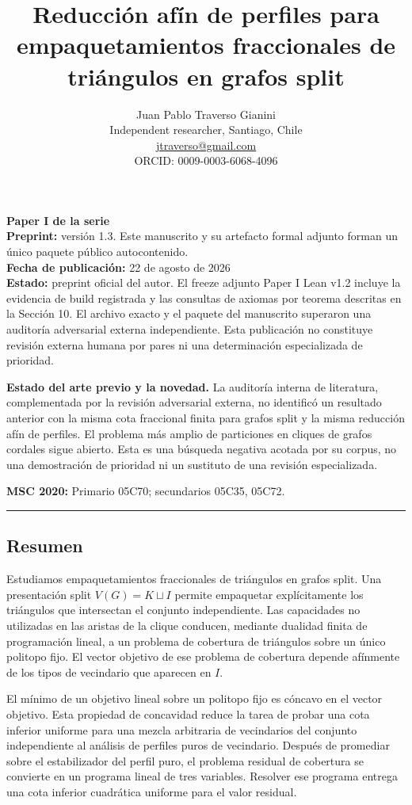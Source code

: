 \documentclass[
  spanish,
  11pt,
  a4paper,
]{article}
\title{Reducción afín de perfiles para empaquetamientos fraccionales de triángulos en grafos split}
\author{Juan Pablo Traverso Gianini\\
\small Independent researcher, Santiago, Chile\\
\small \href{mailto:jtraverso@gmail.com}{jtraverso@gmail.com}\\
\small ORCID: 0009-0003-6068-4096}
\date{}
\begin{document}
\sloppy
\raggedbottom
\maketitle

\textbf{Paper I de la serie}\\
\textbf{Preprint:} versión 1.3. Este manuscrito y su artefacto formal adjunto forman un único paquete público autocontenido.\\
\textbf{Fecha de publicación:} 22 de agosto de 2026\\
\textbf{Estado:} preprint oficial del autor. El freeze adjunto Paper I Lean v1.2 incluye la evidencia de build registrada y las consultas de axiomas por teorema descritas en la Sección 10. El archivo exacto y el paquete del manuscrito superaron una auditoría adversarial externa independiente. Esta publicación no constituye revisión externa humana por pares ni una determinación especializada de prioridad.

\textbf{Estado del arte previo y la novedad.} La auditoría interna de literatura, complementada por la revisión adversarial externa, no identificó un resultado anterior con la misma cota fraccional finita para grafos split y la misma reducción afín de perfiles. El problema más amplio de particiones en cliques de grafos cordales sigue abierto. Esta es una búsqueda negativa acotada por su corpus, no una demostración de prioridad ni un sustituto de una revisión especializada.

\textbf{MSC 2020:} Primario 05C70; secundarios 05C35, 05C72.

\begin{center}\rule{0.5\linewidth}{0.5pt}\end{center}

\subsection{Resumen}\label{resumen}

Estudiamos empaquetamientos fraccionales de triángulos en grafos split. Una presentación split \(V(G)=K\sqcup I\) permite empaquetar explícitamente los triángulos que intersectan el conjunto independiente. Las capacidades no utilizadas en las aristas de la clique conducen, mediante dualidad finita de programación lineal, a un problema de cobertura de triángulos sobre un único politopo fijo. El vector objetivo de ese problema de cobertura depende afínmente de los tipos de vecindario que aparecen en \(I\).

El mínimo de un objetivo lineal sobre un politopo fijo es cóncavo en el vector objetivo. Esta propiedad de concavidad reduce la tarea de probar una cota inferior uniforme para una mezcla arbitraria de vecindarios del conjunto independiente al análisis de perfiles puros de vecindario. Después de promediar sobre el estabilizador del perfil puro, el problema residual de cobertura se convierte en un programa lineal de tres variables. Resolver ese programa entrega una cota inferior cuadrática uniforme para el valor residual.
\end{document}
